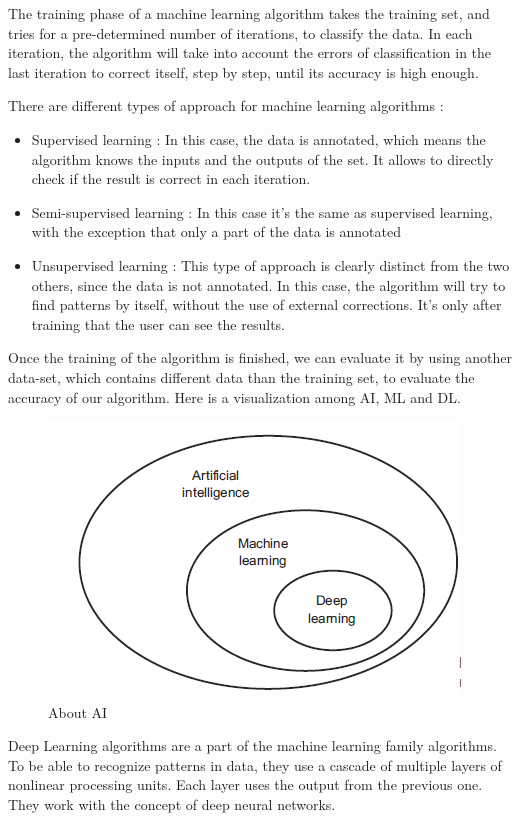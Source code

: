 The training phase of a machine learning algorithm takes the training set, and tries for a pre-determined number of iterations, to classify the data. In each iteration, the algorithm will take into account the errors of classification in the last iteration to correct itself, step by step, until its accuracy is high enough.

There are different types of approach for machine learning algorithms :
\begin{itemize}
\item Supervised learning : In this case, the data is annotated, which means the algorithm knows the inputs and the outputs of the set. It allows to directly check if the result is correct in each iteration.
\item Semi-supervised learning : In this case it's the same as supervised learning, with the exception that only a part of the data is annotated
\item Unsupervised learning : This type of approach is clearly distinct from the two others, since the data is not annotated. In this case, the algorithm will try to find patterns by itself, without the use of external corrections. It's only after training that the user can see the results.
\end{itemize}

Once the training of the algorithm is finished, we can evaluate it by using another data-set, which contains different data than the training set, to evaluate the accuracy of our algorithm. \usetikzlibrary{}Here is a visualization among AI, ML and DL.

\begin{figure}[!ht]
    \center
    \includegraphics[scale=0.5]{figures/aivsmlvsdl.png}
    \caption{About AI}
\end{figure}

Deep Learning algorithms are a part of the machine learning family algorithms. To be able to recognize patterns in data, they use a cascade of multiple layers of nonlinear processing units. Each layer uses the output from the previous one. They work with the concept of deep neural networks.
\\\
\\\



